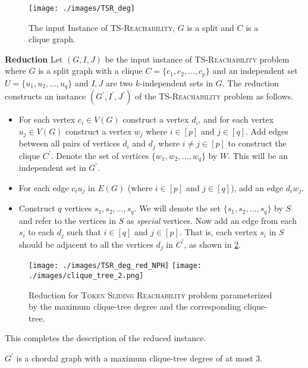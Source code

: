  \begin{figure}
    \centering
    \texttt{[image: ./images/TSR\_deg]}
    \caption{The input Instance of \textsc{TS-Reachability}, $G$ is a split and $C$ is a clique graph.}
    \label{TSR_deg}
\end{figure}


\textbf{Reduction}
Let $(G,I,J)$ be the input instance of \textsc{TS-Reachability} 
problem where $G$ is a split graph with a clique $C=\{c_1,c_2,\ldots,c_p\}$ 
and an independent set $U=\{u_1,u_2,\ldots,u_q\}$ and
$I,J$ are two $k$-independent sets in $G$.
The reduction constructs an instance 
$(G^\prime,I^\prime,J^\prime)$ of the \textsc{TS-Reachability} problem
as follows.
\begin{itemize}
\item For each vertex $c_i\in V(G)$ construct a vertex $d_i$, 
and for each vertex $u_j\in V(G)$ construct a vertex 
$w_j$ where $i\in[p]$ and $j\in[q]$.
Add edges between all pairs of vertices $d_i$ and $d_j$ where 
$i\neq j\in [p]$ to construct the clique $C^{\prime}$.
Denote the set of vertices $\{w_1,w_2,\ldots,w_q\}$ by $W$. 
This will be an independent set in $G^\prime$.
\item For each edge $c_iu_j$ in $E(G)$ (where $i\in [p]$ and $j\in [q]$), add an edge $d_iw_j$.
\item Construct $q$ vertices $s_1,s_2,\ldots,s_q$. We will denote the set $\{s_1,s_2,\ldots,s_q\}$ by $S$ and refer to the vertices in $S$ as \emph{special} vertices. Now add an edge from each $s_i$ to each $d_j$ such that $i\in [q]$ and $j \in [p]$. That is, each vertex $s_i$ in $S$ should be adjacent to all the vertices $d_j$ in $C^\prime$, as shown in \cref{TSR_deg_NPH}.
\end{itemize}
\begin{figure}
    \centering
    \texttt{[image: ./images/TSR\_deg\_red\_NPH]}
    \texttt{[image: ./images/clique\_tree\_2.png]}
    \caption{Reduction for \textsc{Token Sliding Reachability} problem parameterized by the maximum clique-tree degree and the corresponding clique-tree.}
    \label{TSR_deg_NPH}
\end{figure}
This completes the description of the reduced instance. 
\begin{lemma}
$G^\prime$ is a chordal graph with a maximum clique-tree degree of
at most $3$.
\end{lemma}
